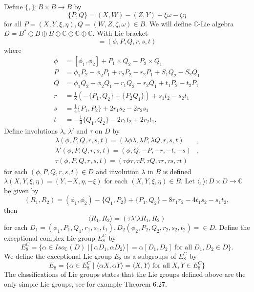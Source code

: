 \documentclass{article}
\theoremstyle{plain}
\theoremstyle{definition}
\numberwithin{thm}{section}
\begin{document}
		Define $\{ , \}\colon B \times B \to B$ by
		\begin{equation*}
			\{ P,Q \} = (X,W)-(Z,Y)+\xi \omega-\zeta \eta 
		\end{equation*}
		for all $P=(X,Y,\xi,\eta),Q=(W,Z,\zeta,\omega)\in B$.
		We will define $\mathbb{C}$-Lie algebra $D = B^*\oplus B \oplus B \oplus \mathbb{C} \oplus \mathbb{C} \oplus \mathbb{C}$.
		With Lie bracket
		\begin{equation*}
			[(\phi_1,P_1,Q_1,r_1,s_1,t_1),(\phi_2,P_2,Q_2,r_2,s_2,t_2)]=(\phi,P,Q,r,s,t)
		\end{equation*}
		where
		\begin{align*}
			\phi&=[\phi_1,\phi_2]+P_1\times Q_2-P_2\times Q_1\\
			P&=\phi_1P_2-\phi_2P_1+r_2P_2-r_2P_1+S_1Q_2-S_2Q_1\\
			Q&=\phi_1Q_2-\phi_2Q_1-r_1Q_2-r_2Q_1+t_1P_2-t_2P_1\\
			r&=\frac{1}{8}(-\{ P_1,Q_2 \}+ \{ P_2 Q_1 \} )+s_1t_2-s_2t_1\\
			s&=\frac{1}{4}\{ P_1,P_2 \}+2r_1s_2-2r_2s_1\\
			t&=-\frac{1}{4}\{ Q_1,Q_2 \}-2r_1t_2+2r_2t_1.
		\end{align*}
		Define involutions $\lambda$, $\lambda'$ and $\tau$ on $D$ by
		\begin{align*}
			\lambda(\phi,P,Q,r,s,t)=(\lambda\phi\lambda,\lambda P,\lambda Q,r,s,t)&,\\
			\lambda'(\phi,P,Q,r,s,t)=(\phi,Q,-P,-r,-t,-s)&,\\
			\tau(\phi,P,Q,r,s,t)=(\tau\phi\tau,\tau P,\tau Q,\tau r,\tau s,\tau t)&
		\end{align*}
		for each $(\phi,P,Q,r,s,t)\in D$ and involution $\lambda$ in $B$ is defined $\lambda(X,Y,\xi,\eta)=(Y,-X,\eta,-\xi)$ for each $(X,Y,\xi,\eta)\in B$.
		Let $\langle , \rangle\colon D\times D \to \mathbb{C}$ be given by
		\begin{equation*}
			(R_1,R_2)=(\phi_1,\phi_2)-\{ Q_1,P_2 \}+ \{ P_1,Q_2 \}-8r_1r_2-4t_1s_2-s_1t_2,
		\end{equation*}
		then
		\begin{equation*}
			\langle R_1,R_2 \rangle=(\tau\lambda'\lambda R_1,R_2)
		\end{equation*}
		for each $D_1=(\phi_1,P_1,Q_1,r_1,s_1,t_1),D_2(\phi_2,P_2,Q_2,r_2,s_2,t_2)=\in D$.
		Define the exceptional complex Lie group $E_8^C$ by
		\begin{equation*}
			E_8^C=\{ \alpha \in Iso_{\mathbb{C}}(D) \; |[\alpha D_1, \alpha D_2 \rangle] = \alpha [D_1,D_2] \; \text{for all} \; D_1,D_2\in D \}.
		\end{equation*}
		We define the exceptional Lie group $E_8$ as a subgroups of $E_8^C$ by
		\begin{equation*}
			E_8=\{ \alpha \in E_8^C \; | \; \langle \alpha X, \alpha Y \rangle = \langle X,Y \rangle \; \text{for all} \; X,Y\in E_8^C \}
		\end{equation*}
		The classifications of Lie groups states that the Lie groups defined above are the only simple Lie groups, see for example \cite[\S 5]{TLI&II} Theorem 6.27.
		
\end{document}
